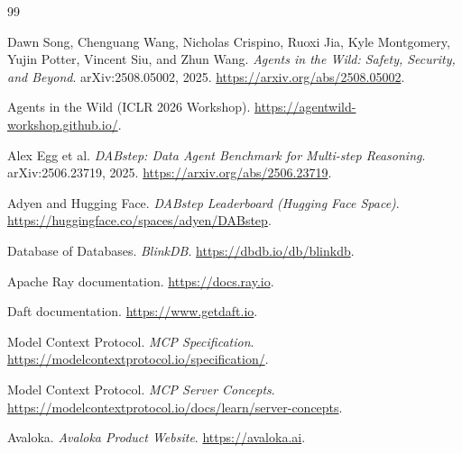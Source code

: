 \documentclass{article} %
\begin{document}
\begin{thebibliography}{99}

Dawn Song, Chenguang Wang, Nicholas Crispino, Ruoxi Jia, Kyle Montgomery, Yujin Potter,
Vincent Siu, and Zhun Wang.
\newblock \emph{Agents in the Wild: Safety, Security, and Beyond}.
\newblock arXiv:2508.05002, 2025. \url{https://arxiv.org/abs/2508.05002}.

Agents in the Wild (ICLR 2026 Workshop).
\newblock \url{https://agentwild-workshop.github.io/}.

Alex Egg et al.
\newblock \emph{DABstep: Data Agent Benchmark for Multi-step Reasoning}.
\newblock arXiv:2506.23719, 2025. \url{https://arxiv.org/abs/2506.23719}.

Adyen and Hugging Face.
\newblock \emph{DABstep Leaderboard (Hugging Face Space)}.
\newblock \url{https://huggingface.co/spaces/adyen/DABstep}.

Database of Databases.
\newblock \emph{BlinkDB}.
\newblock \url{https://dbdb.io/db/blinkdb}.

Apache Ray documentation.
\newblock \url{https://docs.ray.io}.

Daft documentation.
\newblock \url{https://www.getdaft.io}.

Model Context Protocol.
\newblock \emph{MCP Specification}.
\newblock \url{https://modelcontextprotocol.io/specification/}.

Model Context Protocol.
\newblock \emph{MCP Server Concepts}.
\newblock \url{https://modelcontextprotocol.io/docs/learn/server-concepts}.

Avaloka.
\newblock \emph{Avaloka Product Website}.
\newblock \url{https://avaloka.ai}.

\end{thebibliography}
\end{document}
